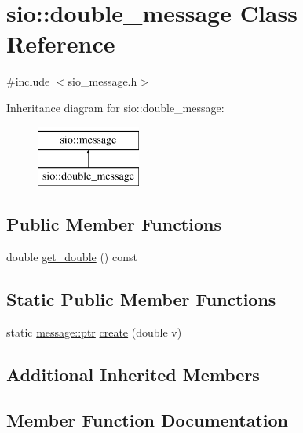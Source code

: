 \hypertarget{classsio_1_1double__message}{}\section{sio\+:\+:double\+\_\+message Class Reference}
\label{classsio_1_1double__message}


{\ttfamily \#include $<$sio\+\_\+message.\+h$>$}

Inheritance diagram for sio\+:\+:double\+\_\+message\+:\begin{figure}[H]
\begin{center}
\leavevmode
\includegraphics[height=2.000000cm]{classsio_1_1double__message}
\end{center}
\end{figure}
\subsection*{Public Member Functions}
\begin{DoxyCompactItemize}
\item 
double \hyperlink{classsio_1_1double__message_a0ab6e4c4e579356b367bb0ef37e79c62}{get\+\_\+double} () const
\end{DoxyCompactItemize}
\subsection*{Static Public Member Functions}
\begin{DoxyCompactItemize}
\item 
static \hyperlink{classsio_1_1message_a6340b6fef57e4516eb17928b1885a615}{message\+::ptr} \hyperlink{classsio_1_1double__message_a5bb130ec91b4b15f83bef32f5701054b}{create} (double v)
\end{DoxyCompactItemize}
\subsection*{Additional Inherited Members}


\subsection{Member Function Documentation}
\mbox{\label{classsio_1_1double__message_a5bb130ec91b4b15f83bef32f5701054b}} 
